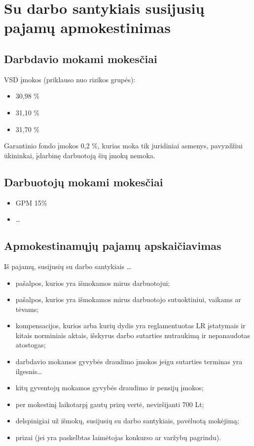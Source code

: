\chapter{Su darbo santykiais susijusių pajamų apmokestinimas}

\section{Darbdavio mokami mokesčiai}

VSD įmokos (priklauso nuo rizikos grupės):
\begin{itemize}
  \item 30,98 \%
  \item 31,10 \%
  \item 31,70 \%
\end{itemize}

Garantinio fondo įmokos 0,2 \%, kurias moka tik juridiniai asmenys,
pavyzdžiui ūkininkai, įdarbinę darbuotoją šių įmokų nemoka.


\section{Darbuotojų mokami mokesčiai}

\begin{itemize}
  \item GPM 15\%
  \item …
\end{itemize}

\section{Apmokestinamųjų pajamų apskaičiavimas}

Iš pajamų, susijusių su darbo santykiais …

\begin{itemize}
  \item pašalpos, kurios yra išmokamos mirus darbuotojui;
  \item pašalpos, kurios yra išmokamos mirus darbuotojo sutuoktiniui, 
    vaikams ar tėvams;
  \item kompensacijos, kurios arba kurių dydis yra reglamentuotas
    LR įstatymais ir kitais norminiais aktais, išskyrus darbo sutarties
    nutraukimą ir nepanaudotas atostogas;
  \item darbdavio mokamos gyvybės draudimo įmokos jeigu sutarties terminas
    yra ilgesnis…
  \item kitų gyventojų mokamos gyvybės draudimo ir pensijų įmokos;
  \item per mokestinį laikotarpį gautų prizų vertė, neviršijanti
    700 Lt;
  \item delspinigiai už išmokų, susijusių su darbo santykiais,
    pavėluotą mokėjimą;
  \item prizai (jei yra paskelbtas laimėtojas konkurso ar varžybų
    pagrindu).
\end{itemize}


